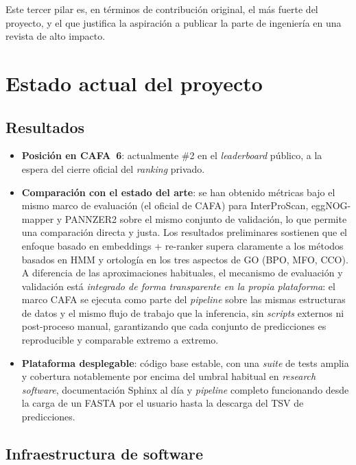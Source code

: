 \documentclass[11pt,a4paper]{article}
\begin{document}
Este tercer pilar es, en términos de contribución original, el más fuerte del
proyecto, y el que justifica la aspiración a publicar la parte de ingeniería
en una revista de alto impacto.

\section{Estado actual del proyecto}

\subsection{Resultados}

\begin{itemize}[leftmargin=1.5em]
  \item \textbf{Posición en CAFA~6}: actualmente \#2 en el \emph{leaderboard}
    público, a la espera del cierre oficial del \emph{ranking} privado.
  \item \textbf{Comparación con el estado del arte}: se han obtenido métricas
    bajo el mismo marco de evaluación (el oficial de CAFA) para InterProScan,
    eggNOG-mapper y PANNZER2 sobre el mismo conjunto de validación, lo que
    permite una comparación directa y justa. Los resultados preliminares
    sostienen que el enfoque basado en embeddings + re-ranker supera
    claramente a los métodos basados en HMM y ortología en los tres aspectos
    de GO (BPO, MFO, CCO). A diferencia de las aproximaciones habituales, el
    mecanismo de evaluación y validación está \emph{integrado de forma
    transparente en la propia plataforma}: el marco CAFA se ejecuta como parte
    del \emph{pipeline} sobre las mismas estructuras de datos y el mismo flujo
    de trabajo que la inferencia, sin \emph{scripts} externos ni post-proceso
    manual, garantizando que cada conjunto de predicciones es reproducible y
    comparable extremo a extremo.
  \item \textbf{Plataforma desplegable}: código base estable, con una
    \emph{suite} de tests amplia y cobertura notablemente por encima del
    umbral habitual en \emph{research software}, documentación Sphinx al día y
    \emph{pipeline} completo funcionando desde la carga de un FASTA por el
    usuario hasta la descarga del TSV de predicciones.
\end{itemize}

\subsection{Infraestructura de software}
\end{document}
